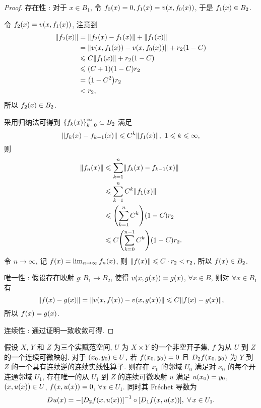 \begin{proof}
存在性 : 对于 $x\in B_{1}$, 令 $f_{0}\xk{x}=0,f_{1}\xk{x}=v\xk{x,f_{0}\xk{x}}$, 于是 $f_{1}\xk{x}\in B_{2}$.\par 
令 $f_{2}\xk{x}=v\xk{x,f_{1}\xk{x}}$, 注意到 
\begin{align*}
\fs{f_{2}\xk{x}} & = \fs{f_{2}\xk{x}-f_{1}\xk{x}}+\fs{f_{1}\xk{x}}\\
& = \fs{v\xk{x,f_{1}\xk{x}}-v\xk{x,f_{0}\xk{x}}}+r_{2}\xk{1-C}\\
& \leq C\fs{f_{1}\xk{x}}+r_{2}\xk{1-C}\\
& \leq \xk{C+1}\xk{1-C}r_{2}\\
& = \xk{1-C^{2}}r_{2}\\
& < r_{2},
\end{align*}
所以 $f_{2}\xk{x}\in B_{2}$.\par 
采用归纳法可得到 $\dk{f_{k}\xk{x}}_{k=0}^{\infty}\subset B_{2}$ 满足 
\[\fs{f_{k}\xk{x}-f_{k-1}\xk{x}}\leq C^{k}\fs{f_{1}\xk{x}},\ 1\leq k\leq \infty,\]
则
\begin{align*}
\fs{f_{n}\xk{x}} & \leq\sum_{k=1}^{n}\fs{f_{k}\xk{x}-f_{k-1}\xk{x}}\\
& \leq \sum_{k=1}^{n}C^{k}\fs{f_{1}\xk{x}}\\
& \leq \xk{\sum_{k=1}^{n}C^{k}}\xk{1-C}r_{2}\\
& \leq C\xk{\sum_{k=0}^{n-1}C^{k}}\xk{1-C}r_{2}.
\end{align*}
令 $n\to\infty$, 记 $f\xk{x}=\lim _{n\toi}f_{n}\xk{x}$, 则 $\fs{f\xk{x}}\leq C\cdot r_{2}<r_{2}$, 所以 $f\xk{x}\in B_{2}$.\par 
唯一性 : 假设存在映射 $g:B_{1}\to B_{2}$, 使得 $v\xk{x,g\xk{x}}=g\xk{x}$, $\forall x\in B$, 则对 $\forall x\in B_{1}$ 有
\[\fs{f\xk{x}-g\xk{x}}=\fs{v\xk{x,f\xk{x}}-v\xk{x,g\xk{x}}}\leq C\fs{f\xk{x}-g\xk{x}},\]
所以 $f\xk{x}=g\xk{x}$.\par 
连续性 : 通过证明一致收敛可得.
\end{proof}
\begin{theorem}[隐函数存在定理]
假设 $X$, $Y$ 和 $Z$ 为三个实赋范空间, $U$ 为 $X\times Y$ 的一个非空开子集, $f$ 为从 $U$ 到 $Z$ 的一个连续可微映射. 对于 $\left(x_{0},y_{0}\right)\in U$, 若 $f\xk{x_{0},y_{0}}=0$ 且 $D_{2}f\xk{x_{0},y_{0}}$ 为 $Y$ 到 $Z$ 的一个具有连续逆的连续实线性算子. 则存在 $x_{0}$ 的邻域 $U_{0}$ 满足对 $x_{0}$ 的每个开连通邻域 $U_{1}$, 存在唯一的从 $U_{1}$ 到 $Z$ 的连续可微映射 $u$ 满足 $u\xk{x_{0}}=y_{0}$, $\xk{x,u\xk{x}}\in U$, $f\xk{x,u\xk{x}}=0$, $\forall x\in U_{1}$. 同时其 Fr\'echet 导数为
\[D u\xk{x}=-\zk{D_{2}f\xk{x,u\xk{x}}}^{-1}\circ\zk{D_{1}f\xk{x,u\xk{x}}},\ \forall x\in U_{1}.\]
\end{theorem}